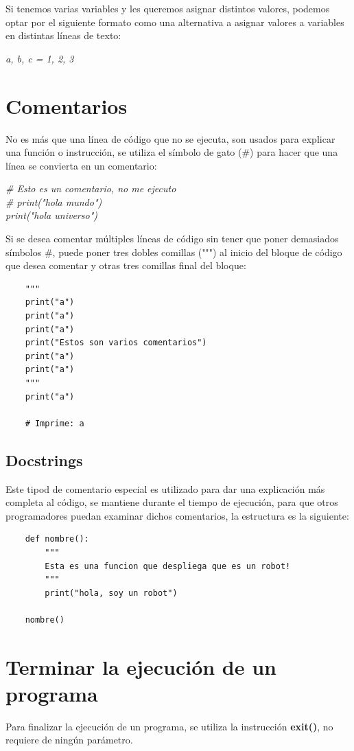 Si tenemos varias variables y les queremos asignar distintos valores, podemos optar por el siguiente formato como una alternativa a asignar valores a variables en distintas líneas de texto:
\begin{center}
	\textit{a, b, c = 1, 2, 3}
\end{center}



\section{Comentarios}
\hspace{0.55cm}No es más que una línea de código que no se ejecuta, son usados para explicar una función o instrucción, se utiliza el símbolo de gato (\#) para hacer que una línea se convierta en un comentario:
\begin{center}
	\textit{
		\# Esto es un comentario, no me ejecuto \\
		\# print("hola mundo") \\
		print("hola universo")
	}
\end{center}

Si se desea comentar múltiples líneas de código sin tener que poner demasiados símbolos \#, puede poner tres dobles comillas (""") al inicio del bloque de código que desea comentar y otras tres comillas final del bloque:
\begin{lstlisting}
	"""
	print("a")
	print("a")
	print("a")
	print("Estos son varios comentarios")
	print("a")
	print("a")
	"""
	print("a")
	
	# Imprime: a
\end{lstlisting}


\subsection{Docstrings}
\hspace{0.55cm}Este tipod de comentario especial es utilizado para dar una explicación más completa al código, se mantiene durante el tiempo de ejecución, para que otros programadores puedan examinar dichos comentarios, la estructura es la siguiente:
\begin{lstlisting}
	def nombre():
		"""
		Esta es una funcion que despliega que es un robot!
		"""
		print("hola, soy un robot")
		
	nombre()
\end{lstlisting}



\section{Terminar la ejecución de un programa}
\hspace{0.55cm}Para finalizar la ejecución de un programa, se utiliza la instrucción \textbf{exit()}, no requiere de ningún parámetro.
